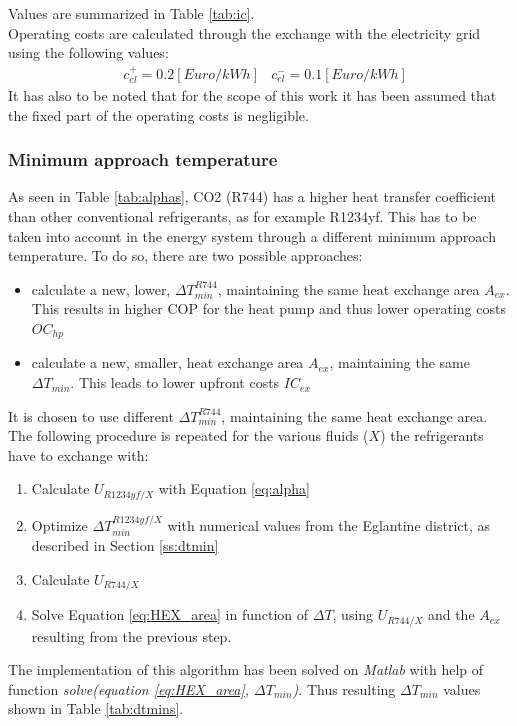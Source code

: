 \documentclass{article}
\begin{document}


Values are summarized in Table \ref{tab:ic}.\\

Operating costs are calculated through the exchange with the electricity grid using the following values:
\begin{align}
	& c_{el}^{+} = 0.2 [Euro/kWh]
	& c_{el}^{-} = 0.1 [Euro/kWh]
\end{align}
It has also to be noted that for the scope of this work it has been assumed that the fixed part of the operating costs is negligible.

\subsubsection{Minimum approach temperature}
As seen in Table \ref{tab:alphas}, CO2 (R744) has a higher heat transfer coefficient than other conventional refrigerants, as for example R1234yf. This has to be taken into account in the energy system through a different minimum approach temperature. To do so, there are two possible approaches:
\begin{itemize}
	\item calculate a new, lower, $\Delta T_{min}^{R744}$, maintaining the same heat exchange area $A_{ex}$. This results in higher COP for the heat pump and thus lower operating costs $OC_{hp}$
	\item calculate a new, smaller, heat exchange area  $A_{ex}$, maintaining the same $\Delta T_{min}$. This leads to lower upfront costs $IC_{ex}$
\end{itemize}

It is chosen to use different $\Delta T_{min}^{R744}$, maintaining the same heat exchange area. The following procedure is repeated for the various fluids ($X$) the refrigerants have to exchange with:
\begin{enumerate}
	\item Calculate $U_{R1234yf/X}$ with Equation \ref{eq:alpha}
	\item Optimize $\Delta T_{min}^{R1234yf/X}$ with numerical values from the Eglantine district, as described in Section \ref{ss:dtmin}
	\item Calculate  $U_{R744/X}$ 
	\item Solve Equation \ref{eq:HEX_area} in function of $\Delta T$, using $U_{R744/X}$ and the $A_{ex}$ resulting from the previous step.
\end{enumerate}

The implementation of this algorithm has been solved on \textit{Matlab} with help of function \textit{solve(equation \ref{eq:HEX_area}, $\Delta T_{min}$)}.
Thus resulting $\Delta T_{min}$ values shown in Table \ref{tab:dtmins}.
\end{document}
